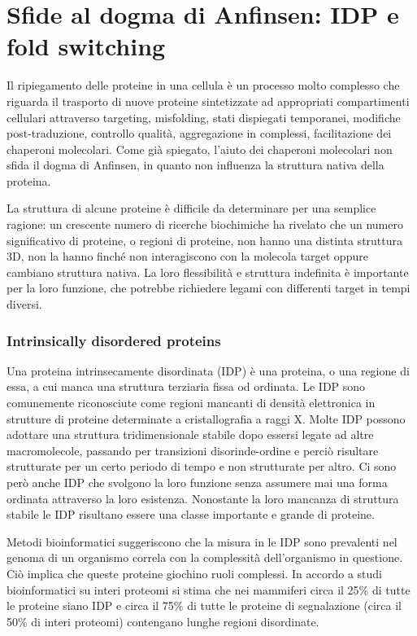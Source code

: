 \section{Sfide al dogma di Anfinsen: IDP e fold switching} \label{sfide-dogma}
{
{

Il ripiegamento delle proteine in una cellula è un processo molto complesso che riguarda il trasporto di nuove proteine sintetizzate ad appropriati compartimenti cellulari attraverso targeting, misfolding, stati dispiegati temporanei, modifiche post-traduzione, controllo qualità, aggregazione in complessi, facilitazione dei chaperoni molecolari. Come già spiegato, l'aiuto dei chaperoni molecolari non sfida il dogma di Anfinsen, in quanto non influenza la struttura nativa della proteina.
	
\par La struttura di alcune proteine è difficile da determinare per una semplice ragione: un crescente numero di ricerche biochimiche ha rivelato che un numero significativo di proteine, o regioni di proteine, non hanno una distinta struttura 3D, non la hanno finché non interagiscono con la molecola target oppure cambiano struttura nativa. La loro flessibilità e struttura indefinita è importante per la loro funzione, che potrebbe richiedere legami con differenti target in tempi diversi. 

}

\subsubsection{Intrinsically disordered proteins}
Una proteina intrinsecamente disordinata (IDP) è una proteina, o una regione di essa, a cui manca una struttura terziaria fissa od ordinata. Le IDP sono comunemente riconosciute come regioni mancanti di densità elettronica in strutture di proteine determinate a cristallografia a raggi X. Molte IDP possono adottare una struttura tridimensionale stabile dopo essersi legate ad altre macromolecole, passando per transizioni disorinde-ordine e perciò risultare strutturate per un certo periodo di tempo e non strutturate per altro. Ci sono però anche IDP che svolgono la loro funzione senza assumere mai una forma ordinata attraverso la loro esistenza.
Nonostante la loro mancanza di struttura stabile le IDP risultano essere una classe importante e grande di proteine.

\par Metodi bioinformatici suggeriscono che la misura in le IDP sono prevalenti nel genoma di un organismo correla con la complessità dell'organismo in questione. Ciò implica che queste proteine giochino ruoli complessi. In accordo a studi bioinformatici su interi proteomi si stima che nei mammiferi circa il 25\% di tutte le proteine siano IDP e circa il 75\% di tutte le proteine di segnalazione (circa il 50\% di interi proteomi) contengano lunghe regioni disordinate\supercite{kessel_ben-tal_2018}.

}
